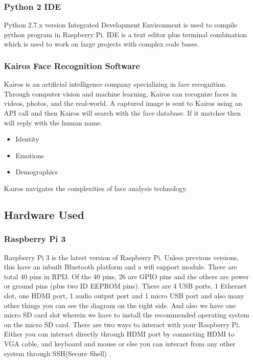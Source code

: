 \documentclass[sigconf]{acmart}
\begin{document}
\subsubsection{Python 2 IDE}
Python 2.7.x version Integrated Development Environment is used to compile python program in Raspberry Pi. IDE is a text editor plus terminal combination which is used to work on large projects with complex code bases.

\subsubsection{Kairos Face Recognition Software}
Kairos is an artificial intelligence company specializing in face recognition. Through computer vision and machine learning, Kairos can recognize faces in videos, photos, and the real-world. A captured image is sent to Kairos using an API call and then Kairos will search with the face database. If it matches then will reply with the human name.

\begin{itemize}
\item Identity
\item Emotions
\item Demographics
\end{itemize}

Kairos navigates the complexities of face analysis technology.

\subsection{Hardware Used}
\subsubsection{Raspberry Pi 3}
Raspberry Pi 3 is the latest version of Raspberry Pi. Unless previous versions, this have an inbuilt Bluetooth platform and a wifi support module. There are total 40 pins in RPI3. Of the 40 pins, 26 are GPIO pins and the others are power or ground pins (plus two ID EEPROM pins). There are 4 USB ports, 1 Ethernet slot, one HDMI port, 1 audio output port and 1 micro USB port and also many other things you can see the diagram on the right side. And also we have one micro SD card slot wherein we have to install the recommended operating system on the micro SD card. There are two ways to interact with your Raspberry Pi. Either you can interact directly through HDMI port by connecting HDMI to VGA cable, and keyboard and mouse or else you can interact from any other system through SSH(Secure Shell) \cite{deligence2017}. 
\end{document}
